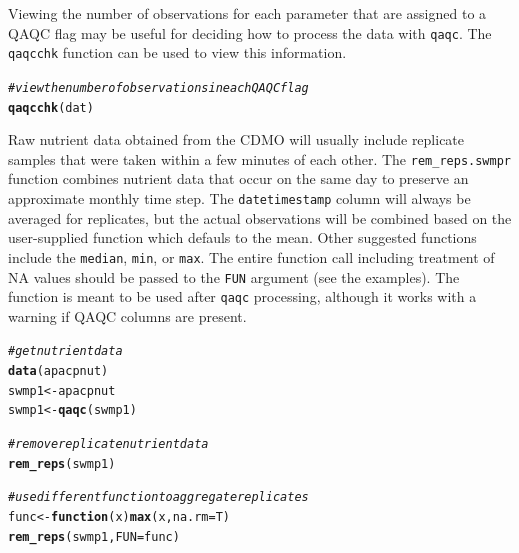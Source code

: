 \documentclass[10pt,letterpaper]{article}\usepackage[]{graphicx}\usepackage[]{color}
\makeatletter
\newcommand{\hlcom}[1]{\textcolor[rgb]{0.678,0.584,0.686}{\textit{#1}}}%
\newcommand{\hlstd}[1]{\textcolor[rgb]{0.345,0.345,0.345}{#1}}%
\newcommand{\hlkwa}[1]{\textcolor[rgb]{0.161,0.373,0.58}{\textbf{#1}}}%
\newcommand{\hlkwb}[1]{\textcolor[rgb]{0.69,0.353,0.396}{#1}}%
\newcommand{\hlkwc}[1]{\textcolor[rgb]{0.333,0.667,0.333}{#1}}%
\newcommand{\hlkwd}[1]{\textcolor[rgb]{0.737,0.353,0.396}{\textbf{#1}}}%
\newenvironment{kframe}{%
 \def\at@end@of@kframe{}%
 \ifinner\ifhmode%
  \def\at@end@of@kframe{\end{minipage}}%
  \begin{minipage}{\columnwidth}%
 \fi\fi%
 \def\FrameCommand##1{\hskip\@totalleftmargin \hskip-\fboxsep
 \colorbox{shadecolor}{##1}\hskip-\fboxsep
     \hskip-\linewidth \hskip-\@totalleftmargin \hskip\columnwidth}%
 \MakeFramed {\advance\hsize-\width
   \@totalleftmargin\z@ \linewidth\hsize
   \@setminipage}}%
 {\par\unskip\endMakeFramed%
 \at@end@of@kframe}
\newenvironment{knitrout}{}{} %
\makeatother
\begin{document}
Viewing the number of observations for each parameter that are assigned to a \ac{QAQC} flag may be useful for deciding how to process the data with \texttt{qaqc}.  The \texttt{qaqcchk} function can be used to view this information.

\begin{knitrout}
\color{fgcolor}\begin{kframe}
\begin{alltt}
\hlcom{# view the number of observations in each QAQC flag}
\hlkwd{qaqcchk}\hlstd{(dat)}
\end{alltt}
\end{kframe}
\end{knitrout}

Raw nutrient data obtained from the \ac{CDMO} will usually include replicate samples that were taken within a few minutes of each other.  The \texttt{rem\_reps.swmpr} function combines nutrient data that occur on the same day to preserve an approximate monthly time step.  The \texttt{datetimestamp} column will always be averaged for replicates, but the actual observations will be combined based on the user-supplied function which defauls to the mean.  Other suggested functions include the \texttt{median}, \texttt{min}, or \texttt{max}.  The entire function call including treatment of NA values should be passed to the \texttt{FUN} argument (see the examples).  The function is meant to be used after \texttt{qaqc} processing, although it works with a warning if QAQC columns are present.

\begin{knitrout}
\color{fgcolor}\begin{kframe}
\begin{alltt}
\hlcom{# get nutrient data}
\hlkwd{data}\hlstd{(apacpnut)}
\hlstd{swmp1} \hlkwb{<-} \hlstd{apacpnut}
\hlstd{swmp1} \hlkwb{<-} \hlkwd{qaqc}\hlstd{(swmp1)}

\hlcom{# remove replicate nutrient data}
\hlkwd{rem_reps}\hlstd{(swmp1)}

\hlcom{# use different function to aggregate replicates}
\hlstd{func} \hlkwb{<-} \hlkwa{function}\hlstd{(}\hlkwc{x}\hlstd{)} \hlkwd{max}\hlstd{(x,} \hlkwc{na.rm} \hlstd{= T)}
\hlkwd{rem_reps}\hlstd{(swmp1,} \hlkwc{FUN} \hlstd{= func)}
\end{alltt}
\end{kframe}
\end{knitrout}
\end{document}
